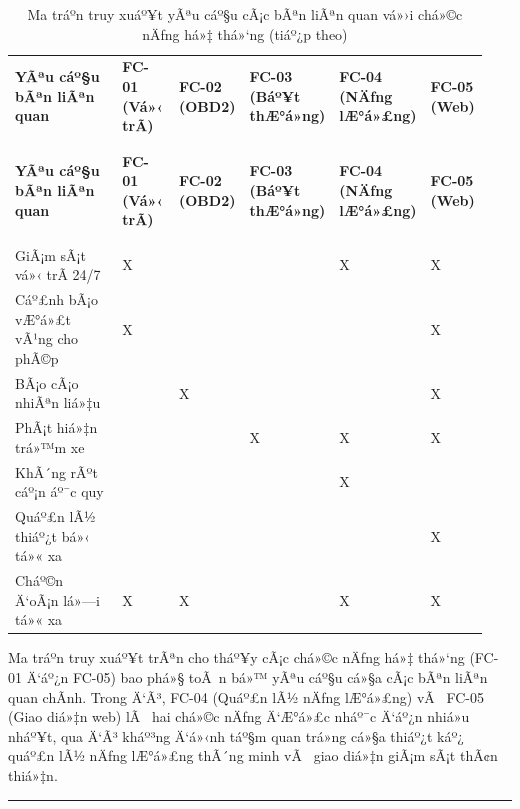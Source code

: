 \documentclass[a4paper]{extarticle}
\newcommand{\thesissettableid}[2]{%
  \renewcommand{\thetable}{#1}%
  \renewcommand{\theHtable}{#2}%
}
\begin{document}
{\thesissettableid{2.6}{tab-ch2-ma-tran-truy-xuat-yeu-cau-cac-ben-lien-quan-voi-chuc}
\def\LTcaptype{table}
\begin{longtable}{|L{0.237\linewidth}|L{0.122\linewidth}|L{0.122\linewidth}|L{0.186\linewidth}|L{0.168\linewidth}|L{0.101\linewidth}|}
\caption{Ma tráº­n truy xuáº¥t yÃªu cáº§u cÃ¡c bÃªn liÃªn quan vá»›i chá»©c nÄƒng há»‡ thá»‘ng}\label{tab:ch2-ma-tran-truy-xuat-yeu-cau-cac-ben-lien-quan-voi-chuc}\\
\hline \textbf{YÃªu cáº§u bÃªn liÃªn quan} & \textbf{FC-01 (Vá»‹ trÃ­)} & \textbf{FC-02 (OBD2)} & \textbf{FC-03 (Báº¥t
thÆ°á»ng)} & \textbf{FC-04 (NÄƒng lÆ°á»£ng)} & \textbf{FC-05 (Web)} \\
\\\hline
\endfirsthead
\caption[]{Ma tráº­n truy xuáº¥t yÃªu cáº§u cÃ¡c bÃªn liÃªn quan vá»›i chá»©c nÄƒng há»‡ thá»‘ng (tiáº¿p theo)}\\
\hline \textbf{YÃªu cáº§u bÃªn liÃªn quan} & \textbf{FC-01 (Vá»‹ trÃ­)} & \textbf{FC-02 (OBD2)} & \textbf{FC-03 (Báº¥t
thÆ°á»ng)} & \textbf{FC-04 (NÄƒng lÆ°á»£ng)} & \textbf{FC-05 (Web)} \\
\\\hline
\endhead
\\\hline
\endfoot
\endlastfoot
GiÃ¡m sÃ¡t vá»‹ trÃ­ 24/7 & X & & & X & X \\\hline
Cáº£nh bÃ¡o vÆ°á»£t vÃ¹ng cho phÃ©p & X & & & & X \\\hline
BÃ¡o cÃ¡o nhiÃªn liá»‡u & & X & & & X \\\hline
PhÃ¡t hiá»‡n trá»™m xe & & & X & X & X \\\hline
KhÃ´ng rÃºt cáº¡n áº¯c quy & & & & X & \\\hline
Quáº£n lÃ½ thiáº¿t bá»‹ tá»« xa & & & & & X \\\hline
Cháº©n Ä‘oÃ¡n lá»—i tá»« xa & X & X & & X & X \\\hline
\end{longtable}
}


Ma tráº­n truy xuáº¥t trÃªn cho tháº¥y cÃ¡c chá»©c nÄƒng há»‡ thá»‘ng (FC-01 Ä‘áº¿n FC-05)
bao phá»§ toÃ n bá»™ yÃªu cáº§u cá»§a cÃ¡c bÃªn liÃªn quan chÃ­nh. Trong Ä‘Ã³, FC-04
(Quáº£n lÃ½ nÄƒng lÆ°á»£ng) vÃ  FC-05 (Giao diá»‡n web) lÃ  hai chá»©c nÄƒng Ä‘Æ°á»£c nháº¯c
Ä‘áº¿n nhiá»u nháº¥t, qua Ä‘Ã³ kháº³ng Ä‘á»‹nh táº§m quan trá»ng cá»§a thiáº¿t káº¿ quáº£n lÃ½
nÄƒng lÆ°á»£ng thÃ´ng minh vÃ  giao diá»‡n giÃ¡m sÃ¡t thÃ¢n thiá»‡n.

\begin{center}\rule{0.5\linewidth}{0.5pt}\end{center}
\end{document}
